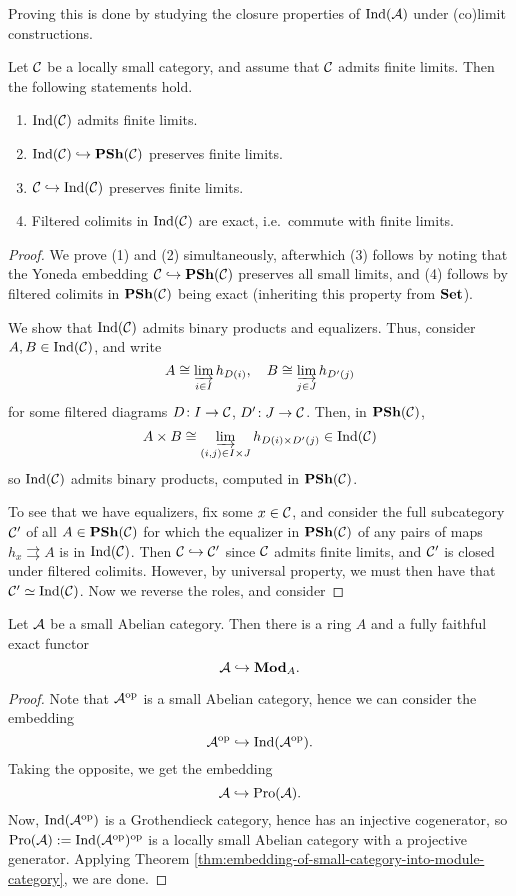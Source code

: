 Proving this is done by studying the closure properties of \(\Ind(\calA)\) under (co)limit constructions.
\begin{proposition}
	Let \(\calC\) be a locally small category, and assume that \(\calC\) admits finite limits. Then the following statements hold.
	\begin{enumerate}[label=(\arabic*)]
	\item \(\Ind(\calC)\) admits finite limits.
	\item \(\Ind(\calC)\inj\PSh(\calC)\) preserves finite limits.
	\item \(\calC\inj\Ind(\calC)\) preserves finite limits.
	\item Filtered colimits in \(\Ind(\calC)\) are exact, i.e.\ commute with finite limits.
	\end{enumerate}
\end{proposition}
\begin{proof}
We prove (1) and (2) simultaneously, afterwhich (3) follows by noting that the Yoneda embedding \(\calC\inj\PSh(\calC)\) preserves all small limits, and (4) follows
by filtered colimits in \(\PSh(\calC)\) being exact (inheriting this property from \(\Set\)).

We show that \(\Ind(\calC)\) admits binary products and equalizers. Thus, consider \(A,B\in\Ind(\calC)\), and write
\[ A \cong \injlim_{i\in I}h_{D(i)},\quad B\cong \injlim_{j\in J}h_{D'(j)}  \]
for some filtered diagrams \(D\!:I\to\calC\), \(D'\!:J\to\calC\). Then, in \(\PSh(\calC)\),
\[ A\times B \cong \injlim_{(i,j)\in I \times J}h_{D(i)\times D'(j)} \in \Ind(\calC) \]
so \(\Ind(\calC)\) admits binary products, computed in \(\PSh(\calC)\).

To see that we have equalizers, fix some \(x\in\calC\), and consider the full subcategory \(\calC'\) of all \(A\in\PSh(\calC)\) for which the equalizer in \(\PSh(\calC)\) of any pairs of maps
\(h_x \rightrightarrows A\) is in \(\Ind(\calC)\). Then \(\calC \inj \calC'\) since \(\calC\) admits finite limits, and \(\calC'\) is closed under filtered colimits. However, by universal property,
we must then have that \(\calC'\simeq\Ind(\calC)\). Now we reverse the roles, and consider
\end{proof}

\begin{theorem}\label{thm:freyd-mitchell-embedding-theorem}
	Let \(\calA\) be a small Abelian category. Then there is a ring \(A\) and a fully faithful exact functor
	\[ \calA\inj\Mod_A. \]
\end{theorem}
\begin{proof}
Note that \(\calA^\op\) is a small Abelian category, hence we can consider the embedding
\[ \calA^\op\inj\Ind(\calA^\op). \]
Taking the opposite, we get the embedding
\[ \calA\inj\Pro(\calA). \]
Now, \(\Ind(\calA^\op)\) is a Grothendieck category, hence has an injective cogenerator, so \(\Pro(\calA) := \Ind(\calA^\op)^\op\) is a locally small
Abelian category with a projective generator. Applying Theorem \ref{thm:embedding-of-small-category-into-module-category}, we are done.
\end{proof}

